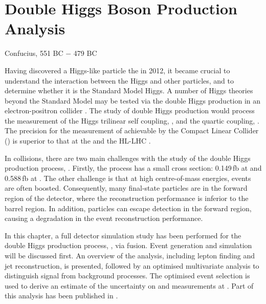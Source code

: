\chapter{Double Higgs Boson Production Analysis}
\label{chap:DoubleHiggs}

%
{Confucius, 551 BC $-$ 479 BC}%


Having discovered a Higgs-like particle the \LHC in 2012\cite{Aad:2012tfa,Chatrchyan:2012ufa}, it became  crucial to understand the interaction between the Higgs and other particles, and  to determine whether it is the Standard Model Higgs. A number of Higgs theories beyond the Standard Model may be tested via the double Higgs production in an electron-positron collider \cite{Kaplan:1983fs,Goldberger:2008zz}. The study of double Higgs production would process the  measurement of the Higgs trilinear self coupling, \gHHH, and the quartic coupling, \gWWHH. The precision for the measurement of \gHHH achievable by the Compact Linear Collider (\CLIC) is superior to that at the \LHC and the HL-LHC  \cite{Contino:2013gna}.


In \ee collisions, there are two main challenges with the study of the double Higgs production process,  \eeToHH. Firstly, the process has a small cross section: 0.149\,fb at  and 0.588\,fb at . The other challenge is that at high centre-of-mass energies, events are often boosted.  Consequently, many final-state particles are in the forward region of the detector, where the reconstruction performance is inferior to the barrel region. In addition, particles can escape detection in the forward region, causing a degradation in the event reconstruction performance.


In this chapter, a full \CLICILD detector simulation study has been performed for the double Higgs production process, \eeToHH, via \WW fusion. Event generation and simulation will be discussed first. An overview of the analysis, including lepton finding and jet reconstruction, is presented, followed by an optimised multivariate analysis to distinguish signal from background processes. The optimised event selection is used to derive an estimate of the uncertainty on  \gHHH and \gWWHH measurements at \CLIC. Part  of this analysis has been published in \cite{Abramowicz:2016zbo}.

